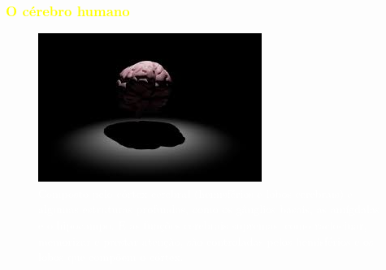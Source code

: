 \documentclass[aspectratio=169]{beamer} %
\begin{document}
{
	
	\begin{frame}
		\frametitle{\textcolor{yellow}{O cérebro humano}}
	\transboxout	
    

	    \begin{figure}
	\centering
        \includegraphics[scale=0.75]{images/cerebro.jpeg} %
		    \caption{\textcolor{white}{Composto pelo córtex cerebral (hemisférios e lobos cerebrais) e algumas estruturas profundas, como os gânglios basais, as amígdalas e o hipocampo. E as funções cerebrais supremas, como raciocinar, memorizar e prestar atenção, são controladas pelos hemisférios e os lobos que compõem o córtex.}} %
	    \end{figure}


\flushright
		\textcolor{blue}{\citep{Abbott2015,Sloan2018}}
		
	\end{frame}
}
\end{document}
